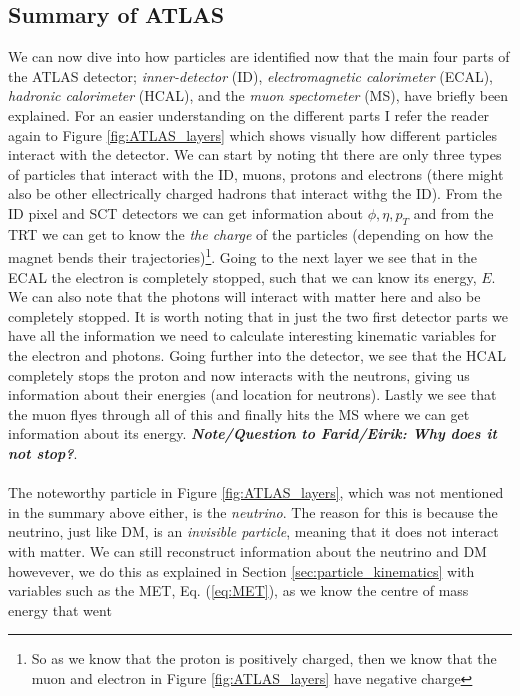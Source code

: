 \documentclass[14pt, a4paper]{book}
\begin{document}
\subsection{Summary of ATLAS}
We can now dive into how particles are identified now that the main four parts of the ATLAS detector; \textit{inner-detector} (ID), \textit{electromagnetic calorimeter} (ECAL), \textit{hadronic calorimeter} (HCAL), and the \textit{muon spectometer} (MS), have 
briefly been explained. For an easier understanding on the different parts I refer the reader again to Figure \ref{fig:ATLAS_layers} which shows visually how different particles interact with the detector. We can start by noting tht there are only three types 
of particles that interact with the ID, muons, protons and electrons (there might also be other ellectrically charged hadrons that interact withg the ID). From the ID pixel and SCT detectors we can get information about $\phi,\eta, p_T$ and from the TRT we  
can get to know the \textit{the charge} of the particles (depending on how the magnet bends their trajectories)\footnote{So as we know that the proton is positively charged, then we know that the muon and electron in Figure \ref{fig:ATLAS_layers} have negative charge}. 
Going to the next layer we see that in the ECAL the electron is completely stopped, such that we can know its energy, $E$. We can also note that the photons will interact with matter here and also be completely stopped. It is worth noting that in just the two 
first detector parts we have all the information we need to calculate interesting kinematic variables for the electron and photons. Going further into the detector, we see that the HCAL completely stops the proton and now interacts with the neutrons, giving us 
information about their energies (and location for neutrons). Lastly we see that the muon flyes through all of this and finally hits the MS where we can get information about its energy. \textit{\textbf{Note/Question to Farid/Eirik: Why does it not stop?}}. \\
\\The noteworthy particle in Figure \ref{fig:ATLAS_layers}, which was not mentioned in the summary above either, is the \textit{neutrino}. The reason for this is because the neutrino, just like DM, is an \textit{invisible particle}, meaning that it does not 
interact with matter. We can still reconstruct information about the neutrino and DM howevever, we do this as explained in Section \ref{sec:particle_kinematics} with variables such as the MET, Eq. (\ref{eq:MET}), as we know the centre of mass energy that went 
\end{document}
